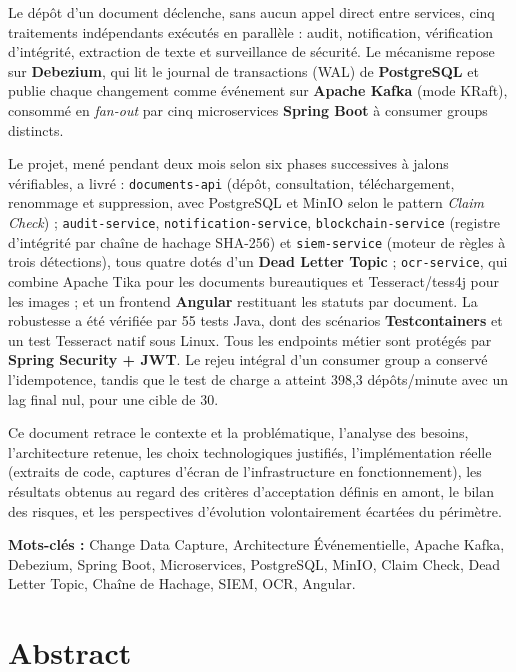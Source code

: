 \documentclass[12pt,a4paper,openany]{report}
\begin{document}
    Le d\'ep\^ot d'un document d\'eclenche, sans aucun appel direct entre services, cinq traitements ind\'ependants ex\'ecut\'es en parall\`ele : audit, notification, v\'erification d'int\'egrit\'e, extraction de texte et surveillance de s\'ecurit\'e. Le m\'ecanisme repose sur \textbf{Debezium}, qui lit le journal de transactions (WAL) de \textbf{PostgreSQL} et publie chaque changement comme \'ev\'enement sur \textbf{Apache Kafka} (mode KRaft), consomm\'e en \emph{fan-out} par cinq microservices \textbf{Spring Boot} \`a consumer groups distincts.

    Le projet, men\'e pendant deux mois selon six phases successives \`a jalons v\'erifiables, a livr\'e : \texttt{documents-api} (d\'ep\^ot, consultation, t\'el\'echargement, renommage et suppression, avec PostgreSQL et MinIO selon le pattern \emph{Claim Check}) ; \texttt{audit-service}, \texttt{notification-service}, \texttt{blockchain-service} (registre d'int\'egrit\'e par cha\^ine de hachage SHA-256) et \texttt{siem-service} (moteur de r\`egles \`a trois d\'etections), tous quatre dot\'es d'un \textbf{Dead Letter Topic} ; \texttt{ocr-service}, qui combine Apache Tika pour les documents bureautiques et Tesseract/tess4j pour les images ; et un frontend \textbf{Angular} restituant les statuts par document. La robustesse a \'et\'e v\'erifi\'ee par 55 tests Java, dont des sc\'enarios \textbf{Testcontainers} et un test Tesseract natif sous Linux. Tous les endpoints m\'etier sont prot\'eg\'es par \textbf{Spring Security + JWT}. Le rejeu int\'egral d'un consumer group a conserv\'e l'idempotence, tandis que le test de charge a atteint 398,3 d\'ep\^ots/minute avec un lag final nul, pour une cible de 30.

    Ce document retrace le contexte et la probl\'ematique, l'analyse des besoins, l'architecture retenue, les choix technologiques justifi\'es, l'impl\'ementation r\'eelle (extraits de code, captures d'\'ecran de l'infrastructure en fonctionnement), les r\'esultats obtenus au regard des crit\`eres d'acceptation d\'efinis en amont, le bilan des risques, et les perspectives d'\'evolution volontairement \'ecart\'ees du p\'erim\`etre.

    \bigskip
    \noindent\textbf{Mots-cl\'es :} Change Data Capture, Architecture \'Ev\'enementielle, Apache Kafka, Debezium, Spring Boot, Microservices, PostgreSQL, MinIO, Claim Check, Dead Letter Topic, Cha\^ine de Hachage, SIEM, OCR, Angular.

    \newpage
    \chapter*{Abstract}
\end{document}

